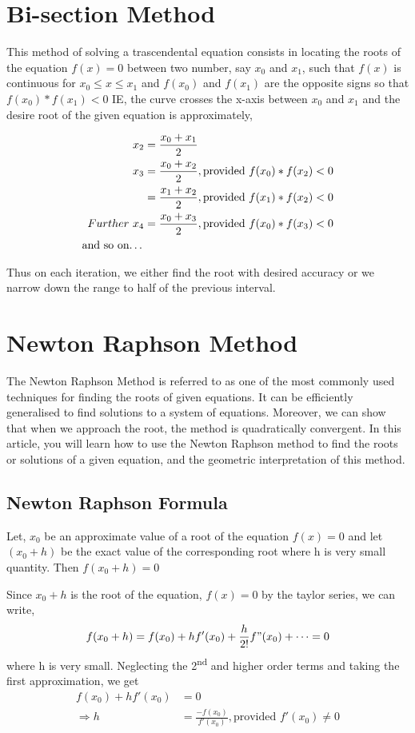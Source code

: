 \documentclass[10pt, twoside, a4paper]{article}
\begin{document}
\section{Bi-section Method}%
This method of solving a trascendental equation consists in locating the roots of the
equation $f(x)=0$ between two number, say $x_0$ and $x_1$, such that $f(x)$ is
continuous for $x_0\leq x\leq x_1$ and $f(x_0)$ and $f(x_1)$ are the opposite signs
so that $f(x_0)*f(x_1)<0$ IE, the curve crosses the x-axis between $x_0$ and $x_1$
and the desire root of the given equation is approximately,
\begin{tcolorbox}
\begin{align*}
           x_2 &= \frac{x_0+x_1}{2}\\
           x_3 &= \frac{x_0+x_2}{2},\text{provided $f(x_0)*f(x_2)<0$}\\
               &= \frac{x_1+x_2}{2},\text{provided $f(x_1)*f(x_2)<0$}\\
  Further\ x_4 &= \frac{x_0+x_3}{2},\text{provided $f(x_0)*f(x_3)<0$}\\
  \text{and so on\dots}
\end{align*}
\end{tcolorbox}
Thus on each iteration, we either find the root with desired accuracy or we narrow down the range to half of the previous interval.

\section{Newton Raphson Method}
The Newton Raphson Method is referred to as one of the most commonly
used techniques for finding the roots of given equations. It can be
efficiently generalised to find solutions to a system of equations.
Moreover, we can show that when we approach the root, the method is
quadratically convergent. In this article, you will learn how to use the
Newton Raphson method to find the roots or solutions of a given equation,
and the geometric interpretation of this method.
\subsection{Newton Raphson Formula}
Let, $x_{0}$ be an approximate value of a root of the
equation $f(x)=0$ and let $(x_{0}+h)$ be the exact value of the
corresponding root where h is very small quantity. Then $f(x_0+h)=0$

Since $x_0+h$ is the root of the equation, $f(x)=0$ by the taylor
series, we can write,
\begin{equation*}
  f(x_0+h)=f(x_0)+hf'(x_0)+\frac{h}{2!}f"(x_0)+\dots = 0
\end{equation*}
where h is very small. Neglecting the 2\textsuperscript{nd} and higher
order terms and taking the first approximation, we get
\begin{align*}
  f(x_0)+hf'(x_0)&=0\\
  \Rightarrow h &= \frac{-f(x_0)}{f'(x_0)}, \text{provided } f'(x_0)\ne 0
\end{align*}
\end{document}
